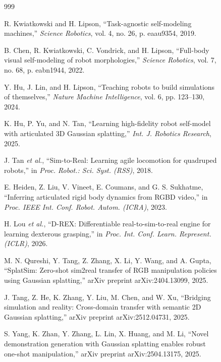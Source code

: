 \documentclass[12pt,a4paper,oneside]{report}
\begin{document}
\begin{figure}[H]
\begin{thebibliography}{999}

R. Kwiatkowski and H. Lipson, ``Task-agnostic self-modeling machines,'' \textit{Science Robotics}, vol. 4, no. 26, p. eaau9354, 2019.


B. Chen, R. Kwiatkowski, C. Vondrick, and H. Lipson, ``Full-body visual self-modeling of robot morphologies,'' \textit{Science Robotics}, vol. 7, no. 68, p. eabn1944, 2022.


Y. Hu, J. Lin, and H. Lipson, ``Teaching robots to build simulations of themselves,'' \textit{Nature Machine Intelligence}, vol. 6, pp. 123--130, 2024.


K. Hu, P. Yu, and N. Tan, ``Learning high-fidelity robot self-model with articulated {3D} Gaussian splatting,'' \textit{Int. J. Robotics Research}, 2025.


J. Tan \textit{et al.}, ``{Sim-to-Real}: Learning agile locomotion for quadruped robots,'' in \textit{Proc. Robot.: Sci. Syst. (RSS)}, 2018.


E. Heiden, Z. Liu, V. Vineet, E. Coumans, and G. S. Sukhatme, ``Inferring articulated rigid body dynamics from RGBD video,'' in \textit{Proc. IEEE Int. Conf. Robot. Autom. (ICRA)}, 2023.


H. Lou \textit{et al.}, ``D-REX: Differentiable real-to-sim-to-real engine for learning dexterous grasping,'' in \textit{Proc. Int. Conf. Learn. Represent. (ICLR)}, 2026.


M. N. Qureshi, Y. Tang, Z. Zhang, X. Li, Y. Wang, and A. Gupta, ``{SplatSim}: Zero-shot sim2real transfer of {RGB} manipulation policies using Gaussian splatting,'' arXiv preprint arXiv:2404.13099, 2025.


J. Tang, Z. He, K. Zhang, Y. Liu, M. Chen, and W. Xu, ``Bridging simulation and reality: Cross-domain transfer with semantic 2D Gaussian splatting,'' arXiv preprint arXiv:2512.04731, 2025.


S. Yang, K. Zhan, Y. Zhang, L. Lin, X. Huang, and M. Li, ``Novel demonstration generation with Gaussian splatting enables robust one-shot manipulation,'' arXiv preprint arXiv:2504.13175, 2025.


\end{thebibliography}
\end{figure}
\end{document}
